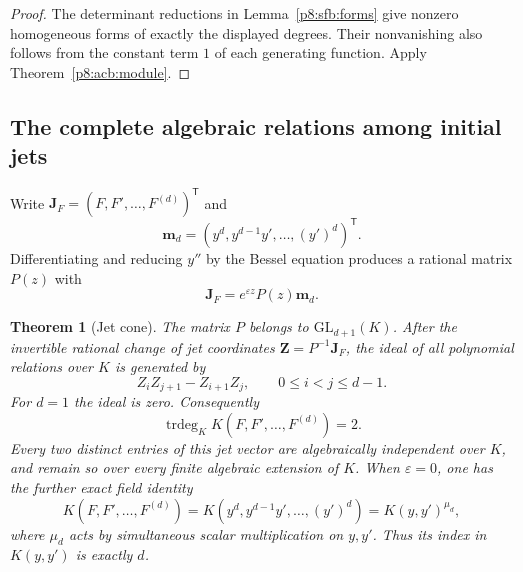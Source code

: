 \documentclass[11pt,a4paper]{article}
\newtheorem{theorem}{Theorem}[section]
\theoremstyle{definition}
\theoremstyle{remark}
\numberwithin{equation}{section}
\begin{document}
\begin{proof}
The determinant reductions in Lemma~\ref{p8:sfb:forms} give nonzero homogeneous
forms of exactly the displayed degrees.  Their nonvanishing
also follows from the constant term $1$ of each generating
function.  Apply Theorem~\ref{p8:acb:module}.
\end{proof}

\subsection{The complete algebraic relations among initial jets}

Write $\mathbf J_F=(F,F',\ldots,F^{(d)})^{\mathsf T}$ and
\[
 \mathbf m_d=(y^d,y^{d-1}y',\ldots,(y')^d)^{\mathsf T}.
\]
Differentiating and reducing $y''$ by the Bessel equation produces
a rational matrix $P(z)$ with
\begin{equation}\label{p8:acb:jetgauge}
 \mathbf J_F=e^{\varepsilon z}P(z)\mathbf m_d.
\end{equation}

\begin{theorem}[Jet cone]\label{p8:acb:jets}
The matrix $P$ belongs to $\mathrm{GL}_{d+1}(K)$.
After the invertible rational change of jet coordinates
$\mathbf Z=P^{-1}\mathbf J_F$, the ideal of all polynomial
relations over $K$ is generated by
\begin{equation}\label{p8:acb:minors}
 Z_iZ_{j+1}-Z_{i+1}Z_j,
             \qquad 0\le i<j\le d-1.
\end{equation}
For $d=1$ the ideal is zero.  Consequently
\[
 \operatorname{trdeg}_{K}K(F,F',\ldots,F^{(d)})=2.
\]
Every two distinct entries of this jet vector are algebraically
independent over $K$, and remain so over every finite algebraic
extension of $K$.
When $\varepsilon=0$, one has the further exact field identity
\[
 K(F,F',\ldots,F^{(d)})
   =K(y^d,y^{d-1}y',\ldots,(y')^d)
   =K(y,y')^{\mu_d},
\]
where $\mu_d$ acts by simultaneous scalar multiplication on
$y,y'$.  Thus its index in $K(y,y')$ is exactly $d$.
\end{theorem}
\end{document}
